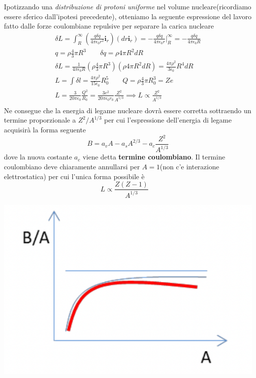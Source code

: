 Ipotizzando una \emph{distribuzione di protoni uniforme} nel volume
nucleare(ricordiamo essere sferico dall'ipotesi precedente), otteniamo
la seguente espressione del lavoro fatto dalle forze coulombiane
repulsive per separare la carica nucleare
\begin{gather*}
    \delta L = \int _{R}^{\infty} \left( \frac{q \delta q}{4 \pi \epsilon_{0}r^{2}}  \bm{i}_{r} \right)(dr \bm{i}_{r})=
                                              - \frac{q \delta q}{4 \pi \epsilon_{0}r} \bigg |_{R}^{\infty} =
                                              - \frac{q \delta q}{4 \pi \epsilon_{0}R}\\
    q = \rho \frac{ 4}{3} \pi R^{3} \qquad \delta q = \rho 4 \pi R^{2} dR\\
    \delta L = \frac{1}{4 \pi \epsilon_{0}R}\left( \rho \frac{ 4}{3}\pi R^{3} \right)(\rho 4 \pi R^{2} dR) = \frac{4 \pi \rho^{2}}{3 \epsilon_{0}}R^{4}dR\\
    L = \int \delta l = \frac{4 \pi \rho^{2}}{15 \epsilon_{0}}R_{0}^{5} \qquad Q = \rho \frac{ 4}{3} \pi R_{0}^{3} = Ze\\
    L = \frac{3}{20 \pi \epsilon_{0}} \frac{Q^{2}}{R_{0}} = \frac{3e^{2}}{20 \pi \epsilon_{0}r_{0}} \frac{Z^{2}}{A^{1/3}}
       \implies L \propto \frac{ Z^{2}}{A^{1/3}}\\
\end{gather*} Ne consegue che la energia di legame nucleare dovrà essere corretta
sottraendo un termine proporzionale a \(Z^{2} / A^{1/3}\) per cui
l'espressione dell'energia di legame acquisirà la forma seguente \[
                                                                      B = a_{v}A - a_{s}A^{2/3} - a_{c} \frac{Z^{2}}{A^{1/3}}
\] dove la nuova costante \(a_{c}\) viene detta \textbf{termine
coulombiano}.
Il termine coulombiano deve chiaramente annullarsi per
\(A=1\)(non c'e interazione elettrostatica) per cui l'unica forma
possibile è \[
                L \propto \frac{Z(Z-1)}{A^{1/3}} \quad
\]
\begin{marginfigure}
    \includegraphics{figs/goccia3}
    \label{fig:goccia3}
\end{marginfigure}

